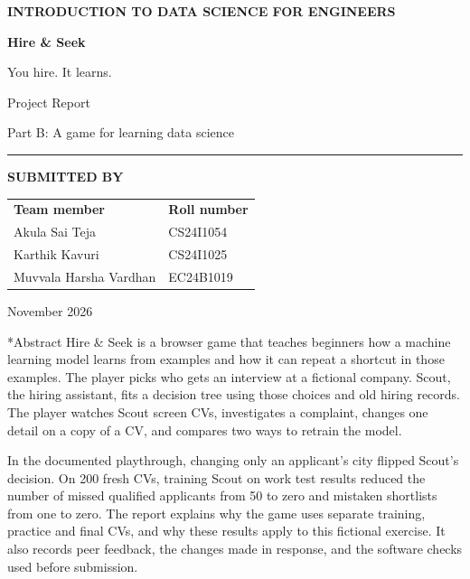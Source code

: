 \documentclass[11pt,a4paper]{article}
\makeatletter
\renewcommand\section{\@startsection{section}{1}{\z@}{-2.2ex \@plus -.5ex}{0.8ex}{\Large\sffamily\bfseries\color{Ink}}}
\newcommand{\eyebrow}[1]{{\small\sffamily\bfseries\color{Teal}#1}\par}
\makeatother
\begin{document}
\hypersetup{pageanchor=false}
\begin{titlepage}
\vspace*{22mm}
\eyebrow{INTRODUCTION TO DATA SCIENCE FOR ENGINEERS}
\vspace{8mm}
{\fontsize{46}{51}\selectfont\sffamily\bfseries\color{Ink}Hire \& Seek\par}
{\LARGE\sffamily\color{Teal}You hire. It learns.\par}
\vspace{8mm}
{\Large\sffamily\color{Ink}Project Report\par}
{\large\color{Muted}Part B: A game for learning data science\par}
\vspace{9mm}
\textcolor{Line}{\rule{\linewidth}{1.2pt}}
\vspace{3mm}

\eyebrow{SUBMITTED BY}
\begin{tabularx}{\linewidth}{@{}Yl@{}}
\textbf{Team member} & \textbf{Roll number}\\
Akula Sai Teja & CS24I1054\\
Karthik Kavuri & CS24I1025\\
Muvvala Harsha Vardhan & EC24B1019\\
\end{tabularx}

\vfill
{\large\color{Muted}November 2026\par}
\end{titlepage}
\hypersetup{pageanchor=true}
\section*{Abstract}
Hire \& Seek is a browser game that teaches beginners how a machine learning model learns from examples and how it can repeat a shortcut in those examples. The player picks who gets an interview at a fictional company. Scout, the hiring assistant, fits a decision tree using those choices and old hiring records. The player watches Scout screen CVs, investigates a complaint, changes one detail on a copy of a CV, and compares two ways to retrain the model.

In the documented playthrough, changing only an applicant's city flipped Scout's decision. On 200 fresh CVs, training Scout on work test results reduced the number of missed qualified applicants from 50 to zero and mistaken shortlists from one to zero. The report explains why the game uses separate training, practice and final CVs, and why these results apply to this fictional exercise. It also records peer feedback, the changes made in response, and the software checks used before submission.
\end{document}
